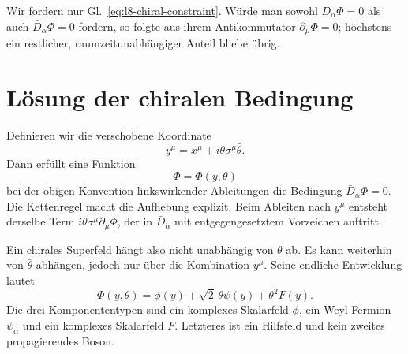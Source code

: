 Wir fordern nur Gl.~\eqref{eq:l8-chiral-constraint}. Würde man sowohl \(D_\alpha\Phi=0\) als auch \(\bar D_{\dot\alpha}\Phi=0\) fordern, so folgte aus ihrem Antikommutator \(\partial_\mu\Phi=0\); höchstens ein restlicher, raumzeitunabhängiger Anteil bliebe übrig.

\section{Lösung der chiralen Bedingung}

Definieren wir die verschobene Koordinate
\begin{equation}
y^\mu=x^\mu+i\theta\sigma^\mu\bar\theta.
\label{eq:l8-chiral-coordinate}
\end{equation}
Dann erfüllt eine Funktion
\begin{equation}
\Phi=\Phi(y,\theta)
\label{eq:l8-chiral-solution}
\end{equation}
bei der obigen Konvention linkswirkender Ableitungen die Bedingung \(\bar D_{\dot\alpha}\Phi=0\). Die Kettenregel macht die Aufhebung explizit. Beim Ableiten nach \(y^\mu\) entsteht derselbe Term \(i\theta\sigma^\mu\partial_\mu\Phi\), der in \(\bar D_{\dot\alpha}\) mit entgegengesetztem Vorzeichen auftritt.

Ein chirales Superfeld hängt also nicht unabhängig von \(\bar\theta\) ab. Es kann weiterhin von \(\bar\theta\) abhängen, jedoch nur über die Kombination \(y^\mu\). Seine endliche Entwicklung lautet
\begin{equation}
\Phi(y,\theta)
=\phi(y)+\sqrt2\,\theta\psi(y)+\theta^2F(y).
\label{eq:l8-chiral-expansion-y}
\end{equation}
Die drei Komponententypen sind ein komplexes Skalarfeld \(\phi\), ein Weyl-Fermion \(\psi_\alpha\) und ein komplexes Skalarfeld \(F\). Letzteres ist ein Hilfsfeld und kein zweites propagierendes Boson.

\begin{classroomqa}
\end{classroomqa}

